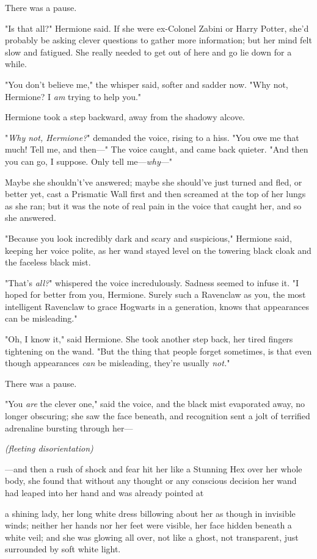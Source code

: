 There was a pause.

"Is that all?" Hermione said. If she were ex-Colonel Zabini or Harry Potter,
she'd probably be asking clever questions to gather more information; but her
mind felt slow and fatigued. She really needed to get out of here and go lie
down for a while.

"You don't believe me," the whisper said, softer and sadder now. "Why not,
Hermione? I \emph{am} trying to help you."

Hermione took a step backward, away from the shadowy alcove.

"\emph{Why not, Hermione?}" demanded the voice, rising to a hiss. "You owe me
that much! Tell me, and then—" The voice caught, and came back quieter. "And
then you can go, I suppose. Only tell me—\emph{why}—"

Maybe she shouldn't've answered; maybe she should've just turned and fled, or
better yet, cast a Prismatic Wall first and then screamed at the top of her
lungs as she ran; but it was the note of real pain in the voice that caught
her, and so she answered.

"Because you look incredibly dark and scary and suspicious," Hermione said,
keeping her voice polite, as her wand stayed level on the towering black cloak
and the faceless black mist.

"That's \emph{all?}" whispered the voice incredulously. Sadness seemed to
infuse it. "I hoped for better from you, Hermione. Surely such a Ravenclaw as
you, the most intelligent Ravenclaw to grace Hogwarts in a generation, knows
that appearances can be misleading."

"Oh, I know it," said Hermione. She took another step back, her tired fingers
tightening on the wand. "But the thing that people forget sometimes, is that
even though appearances \emph{can} be misleading, they're usually \emph{not.}"

There was a pause.

"You \emph{are} the clever one," said the voice, and the black mist evaporated
away, no longer obscuring; she saw the face beneath, and recognition sent a
jolt of terrified adrenaline bursting through her—

\emph{(fleeting disorientation)}

—and then a rush of shock and fear hit her like a Stunning Hex over her whole
body, she found that without any thought or any conscious decision her wand had
leaped into her hand and was already pointed at{\el}

{\el} a shining lady, her long white dress billowing about her as though in
invisible winds; neither her hands nor her feet were visible, her face hidden
beneath a white veil; and she was glowing all over, not like a ghost, not
transparent, just surrounded by soft white light.

